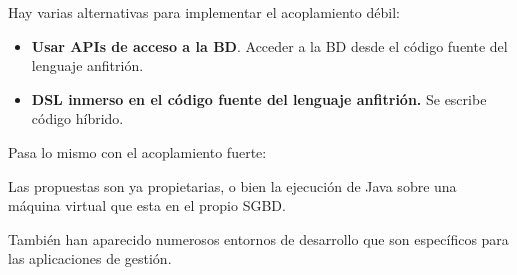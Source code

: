 Hay varias alternativas para implementar el acoplamiento débil:

\begin{itemize}
    \item \textbf{Usar APIs de acceso a la BD}. Acceder a la BD desde el código fuente del lenguaje anfitrión.
    \item \textbf{DSL inmerso en el código fuente del lenguaje anfitrión.} Se escribe código híbrido.
\end{itemize}

Pasa lo mismo con el acoplamiento fuerte:

Las propuestas son ya propietarias, o bien la ejecución de Java sobre una máquina virtual que esta en el propio SGBD.

También han aparecido numerosos entornos de desarrollo que son específicos para las aplicaciones de gestión.

